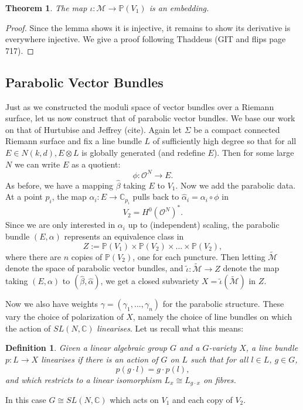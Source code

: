 \documentclass[]{article}
\newtheorem{theorem}{Theorem}
\newtheorem{definition}{Definition}
\newcommand{\C}{\mathbb{C}}
\newcommand{\OO}{\mathcal{O}}
\newcommand{\MM}{\mathcal{M}}
\newcommand{\PP}{\mathbb{P}}
\begin{document}
	\begin{theorem}
		The map $\iota:\MM \to \PP(V_1)$ is an embedding.
	\end{theorem}
	\begin{proof}
		Since the lemma shows it is injective, it remains to show its derivative is everywhere injective. We give a proof following Thaddeus (GIT and flips page 717).
	\end{proof}

	\subsection{Parabolic Vector Bundles}

	Just as we constructed the moduli space of vector bundles over a Riemann surface, let us now construct that of parabolic vector bundles. We base our work on that of Hurtubise and Jeffrey (cite). Again let $\Sigma$ be a compact connected Riemann surface and fix a line bundle $L$ of sufficiently high degree so that for all $E\in N(k,d), E\otimes L$ is globally generated (and redefine $E$). Then for some large $N$ we can write $E$ as a quotient:
	\begin{equation}
		\phi: \OO^N \to E.
	\end{equation}
	As before, we have a mapping $\hat{\beta}$ taking $E$ to $V_1$. Now we add the parabolic data. At a point $p_i$, the map $\alpha_i:E\to \C_{p_i}$ pulls back to $\hat{\alpha}_i = \alpha_i\circ \phi$ in 
	\begin{equation}
		V_2 = H^0(\OO^N)^\ast.
	\end{equation}
	Since we are only interested in $\alpha_i$ up to (independent) scaling, the parabolic bundle $(E,\alpha)$ represents an equivalence class in
	\begin{equation}
		Z := \PP(V_1) \times \PP(V_2) \times ... \times \PP(V_2),
	\end{equation}
	where there are $n$ copies of $\PP(V_2)$, one for each puncture. Then letting $\tilde{\MM}$ denote the space of parabolic vector bundles, and $\tilde{\iota}:\tilde{\MM}\to Z$ denote the map taking $(E,\alpha)$ to $(\hat{\beta},\hat{\alpha})$, we get a closed subvariety $X = \tilde{\iota}\left(\tilde{\MM}\right)$ in $Z$. 

	Now we also have weights $\gamma = (\gamma_1,...,\gamma_n)$ for the parabolic structure. These vary the choice of polarization of $X$, namely the choice of line bundles on which the action of $SL(N,\C)$ \textit{linearises}. Let us recall what this means:
	\begin{definition}
		Given a linear algebraic group $G$ and a $G$-variety $X$, a line bundle $p:L\to X$ \emph{linearises} if there is an action of $G$ on $L$ such that for all $l\in L$, $g\in G$,
		\begin{equation}
			p(g\cdot l) = g\cdot p(l),
		\end{equation}
		and which restricts to a linear isomorphism $L_x \cong L_{g\cdot x}$ on fibres.
	\end{definition}
	In this case $G\cong SL(N,\C)$ which acts on $V_1$ and each copy of $V_2$.
	
\end{document}
